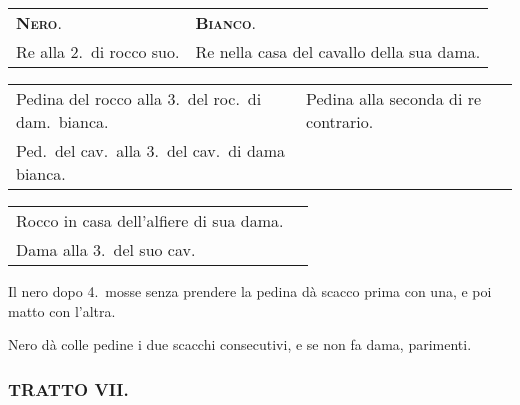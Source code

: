 \documentclass[11pt,a6paper]{article}
\begin{document}
{\small
\noindent
\begin{tabular}{@{}p{3.84cm}p{3.84cm}}
{\bfseries\scshape Nero}. &{\bfseries\scshape Bianco}.\\
Re alla 2.\ di rocco suo. &Re nella casa del cavallo della sua dama.\\
\end{tabular}

\noindent\begin{tabular}{@{}p{3.84cm}p{3.84cm}}
Pedina del rocco alla 3.\ del roc.\ di dam.\ bianca.&Pedina alla seconda di re contrario. \\
Ped.\ del cav.\ alla 3.\ del cav.\ di dama bianca.&\\
\end{tabular}

\noindent\begin{tabular}{@{}p{3.84cm}p{3.84cm}}
Rocco in casa dell'alfiere di sua dama. &\\
Dama alla 3.\ del suo cav.
\end{tabular}}

Il nero dopo 4.\ mosse senza prendere la pedina dà
 scacco prima con una, e poi matto con l'altra.


Nero dà colle pedine i due scacchi consecutivi, e se
non fa dama, parimenti.

\subsubsection{TRATTO VII.}
\end{document}

